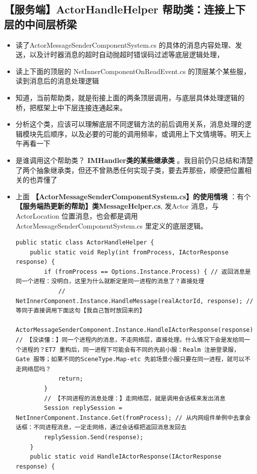 \documentclass[9pt, b5paper]{article}
\begin{document}
\subsection{【服务端】ActorHandleHelper 帮助类：连接上下层的中间层桥梁}
\label{sec-2-18}
\begin{itemize}
\item 读了ActorMessageSenderComponentSystem.cs 的具体的消息内容处理、发送，以及计时器消息的超时自动抛超时错误码过滤等底层逻辑处理，
\item 读上下面的顶层的 NetInnerComponentOnReadEvent.cs 的顶层某个某些服，读到消息后的消息处理逻辑
\item 知道，当前帮助类，就是衔接上面的两条顶层调用，与底层具体处理逻辑的桥，把框架上中下层连接连通起来。
\item 分析这个类，应该可以理解底层不同逻辑方法的前后调用关系，消息处理的逻辑模块先后顺序，以及必要的可能的调用频率，或调用上下文情境等。明天上午再看一下
\item 是谁调用这个帮助类？ \textbf{IMHandler类的某些继承类} 。我目前仍只总结和清楚了两个抽象继承类，但还不曾熟悉任何实现子类，要去弄那些，顺便把位置相关的也弄懂了
\item 上面 \textbf{【ActorMessageSenderComponentSystem.cs】的使用情境} ：有个 \textbf{【服务端热更新的帮助】类MessageHelper.cs}, 发Actor 消息，与ActorLocation 位置消息，也会都是调用 ActorMessageSenderComponentSystem.cs 里定义的底层逻辑。 
\begin{verbatim}
public static class ActorHandleHelper {
    public static void Reply(int fromProcess, IActorResponse response) {
        if (fromProcess == Options.Instance.Process) { // 返回消息是同一个进程：没明白，这里为什么就断定是同一进程的消息了？直接处理
            // NetInnerComponent.Instance.HandleMessage(realActorId, response); // 等同于直接调用下面这句【我自己暂时放回来的】
            ActorMessageSenderComponent.Instance.HandleIActorResponse(response); // 【没读懂：】同一个进程内的消息，不走网络层，直接处理。什么情况下会是发给同一个进程的？ET7 重构后，同一进程下可能会有不同的先前小服：Realm 注册登录服，Gate 服等；如果不同的SceneType.Map-etc 先前场景小服只要在同一进程，就可以不走网络层吗？
            return;
        }
        // 【不同进程的消息处理：】走网络层，就是调用会话框来发出消息
        Session replySession = NetInnerComponent.Instance.Get(fromProcess); // 从内网组件单例中去拿会话框：不同进程消息，一定走网络，通过会话框把返回消息发回去
        replySession.Send(response);
    }
    public static void HandleIActorResponse(IActorResponse response) {

\end{verbatim}
\end{itemize}
\end{document}
